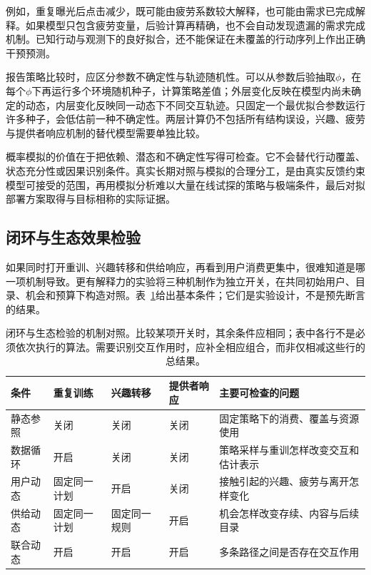 例如，重复曝光后点击减少，既可能由疲劳系数较大解释，也可能由需求已完成解释。如果模型只包含疲劳变量，后验计算再精确，也不会自动发现遗漏的需求完成机制。已知行动与观测下的良好拟合，还不能保证在未覆盖的行动序列上作出正确干预预测。

报告策略比较时，应区分参数不确定性与轨迹随机性。可以从参数后验抽取$\phi$，在每个$\phi$下再运行多个环境随机种子，计算策略差值；外层变化反映在模型内尚未确定的动态，内层变化反映同一动态下不同交互轨迹。只固定一个最优拟合参数运行许多种子，会低估前一种不确定性。两层计算仍不包括所有结构误设，兴趣、疲劳与提供者响应机制的替代模型需要单独比较。

概率模拟的价值在于把依赖、潜态和不确定性写得可检查。它不会替代行动覆盖、状态充分性或因果识别条件。真实长期对照与模拟的合理分工，是由真实反馈约束模型可接受的范围，再用模拟分析难以大量在线试探的策略与极端条件，最后对拟部署方案取得与目标相称的实际证据。

\subsection{闭环与生态效果检验}
\label{sec:rs-feedback-ecosystem-evaluation}

如果同时打开重训、兴趣转移和供给响应，再看到用户消费更集中，很难知道是哪一项机制导致。更有解释力的实验将三种机制作为独立开关，在共同初始用户、目录、机会和预算下构造对照。表~\ref{tab:rs-feedback-controls}给出基本条件；它们是实验设计，不是预先断言的结果。

\begin{table}[htbp]
 \centering
 \small
 \begin{tabularx}{\linewidth}{@{}p{22mm}p{23mm}p{23mm}p{23mm}X@{}}
  \toprule
  条件 & 重复训练 & 兴趣转移 & 提供者响应 & 主要可检查的问题 \\
  \midrule
  静态参照 & 关闭 & 关闭 & 关闭 & 固定策略下的消费、覆盖与资源使用 \\
  数据循环 & 开启 & 关闭 & 关闭 & 策略采样与重训怎样改变交互和估计表示 \\
  用户动态 & 固定同一计划 & 开启 & 关闭 & 接触引起的兴趣、疲劳与离开怎样变化 \\
  供给动态 & 固定同一计划 & 固定同一规则 & 开启 & 机会怎样改变存续、内容与后续目录 \\
  联合动态 & 开启 & 开启 & 开启 & 多条路径之间是否存在交互作用 \\
  \bottomrule
 \end{tabularx}
 \caption{闭环与生态检验的机制对照。比较某项开关时，其余条件应相同；表中各行不是必须依次执行的算法。需要识别交互作用时，应补全相应组合，而非仅相减这些行的总结果。}
 \label{tab:rs-feedback-controls}
\end{table}

